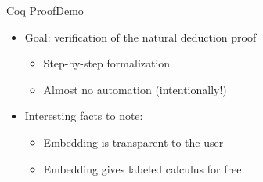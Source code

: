 
\begin{frame}{Coq Proof}{Demo} \small
\begin{itemize}
\item Goal: verification of the natural deduction proof
\begin{itemize}
\item Step-by-step formalization
\item Almost no automation (intentionally!)
\end{itemize}
%
\item Interesting facts to note:
\begin{itemize}
\item Embedding is transparent to the user
\item Embedding gives labeled calculus for free
\end{itemize}
\end{itemize}
\end{frame}
